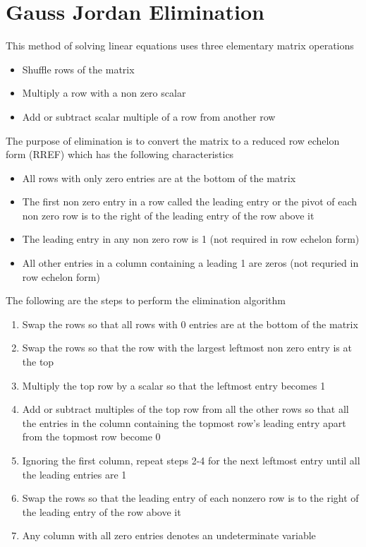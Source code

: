 \documentclass[../../linear_algebra.tex]{subfiles}
\begin{document}
\section{Gauss Jordan Elimination}
This method of solving linear equations uses three elementary matrix operations
\begin{itemize}
    \item Shuffle rows of the matrix
    \item Multiply a row with a non zero scalar
    \item Add or subtract scalar multiple of a row from another row
\end{itemize}

The purpose of elimination is to convert the matrix to a reduced row echelon form (RREF) which has the following characteristics
\begin{itemize}
    \item All rows with only zero entries are at the bottom of the matrix
    \item The first non zero entry in a row called the leading entry or the pivot of each non zero row is to the right of the leading entry of the row above it
    \item The leading entry in any non zero row is 1 (not required in row echelon form)
    \item All other entries in a column containing a leading 1 are zeros (not requried in row echelon form)
\end{itemize}
The following are the steps to perform the elimination algorithm
\begin{enumerate}
    \item Swap the rows so that all rows with 0 entries are at the bottom of the matrix
    \item Swap the rows so that the row with the largest leftmost non zero entry is at the top
    \item Multiply the top row by a scalar so that the leftmost entry becomes 1
    \item Add or subtract multiples of the top row from all the other rows so that all the entries in the column containing the topmost row's leading entry apart from the topmost row become 0
    \item Ignoring the first column, repeat steps 2-4 for the next leftmost entry until all the leading entries are 1
    \item Swap the rows so that the leading entry of each nonzero row is to the right of the leading entry of the row above it
    \item Any column with all zero entries denotes an undeterminate variable
\end{enumerate}
\end{document}
